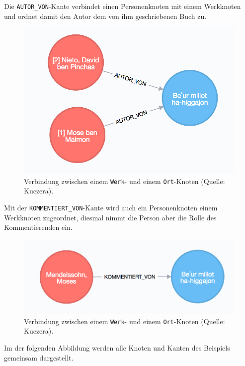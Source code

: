 \documentclass[ngerman,]{scrreprt}
\begin{document}
Die \texttt{AUTOR\_VON}-Kante verbindet einen Personenknoten mit einem Werkknoten und ordnet damit den Autor dem von ihm geschriebenen Buch zu.

\begin{figure}
\centering
\includegraphics{Bilder/Werk-Autor.png}
\caption{Verbindung zwischen einem \texttt{Werk}- und einem \texttt{Ort}-Knoten (Quelle: Kuczera).}
\end{figure}

Mit der \texttt{KOMMENTIERT\_VON}-Kante wird auch ein Personenknoten einem Werkknoten zugeordnet, diesmal nimmt die Person aber die Rolle des Kommentierenden ein.

\begin{figure}
\centering
\includegraphics{Bilder/Werk-Kommentator.png}
\caption{Verbindung zwischen einem \texttt{Werk}- und einem \texttt{Ort}-Knoten (Quelle: Kuczera).}
\end{figure}

Im der folgenden Abbildung werden alle Knoten und Kanten des Beispiels gemeinsam dargestellt.
\end{document}
